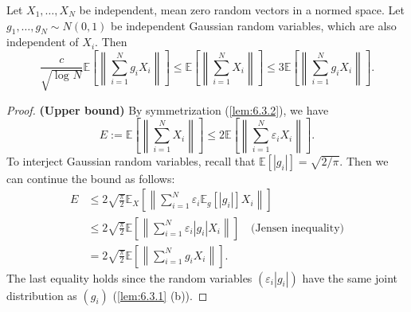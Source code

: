 \begin{lemma}
\label{lem:6.6.2}
Let $X_1, \dots, X_N$ be independent, mean zero random vectors in a normed space. Let $g_1, \dots, g_N 
\sim N(0, 1)$ be independent Gaussian random variables, which are also independent of $X_i$. Then 
\[ \frac{c}{\sqrt{\log_{}{N}}} \mathbb{E}\left[ \left\lVert \sum_{i = 1}^{N} g_iX_i \right\rVert \right] 
\leq \mathbb{E}\left[ \left\lVert \sum_{i = 1}^{N} X_i \right\rVert \right] 
\leq 3 \mathbb{E}\left[ \left\lVert \sum_{i = 1}^{N} g_i X_i \right\rVert \right]. \]
\end{lemma}

\begin{proof}
\textbf{(Upper bound)} By symmetrization (\cref{lem:6.3.2}), we have 
\[ E := \mathbb{E}\left[ \left\lVert \sum_{i = 1}^{N} X_i \right\rVert \right] 
\leq 2 \mathbb{E}\left[ \left\lVert \sum_{i = 1}^{N} \varepsilon_i X_i \right\rVert \right]. \]
To interject Gaussian random variables, recall that $\mathbb{E}\left[ |g_i| \right] = \sqrt{2 / \pi}$. Then 
we can continue the bound as follows: 
\begin{align*}
	E 
	&\leq 2 \sqrt{\frac{\pi}{2}} \mathbb{E}_X\left[ \left\lVert \sum_{i = 1}^{N} \varepsilon_i 
	\mathbb{E}_g\left[ |g_i| \right] X_i \right\rVert \right] \\
	&\leq 2 \sqrt{\frac{\pi}{2}} \mathbb{E}\left[ \left\lVert \sum_{i = 1}^{N} 
	\varepsilon_i |g_i| X_i \right\rVert \right] \quad \text{(Jensen inequality)} \\
	&= 2 \sqrt{\frac{\pi}{2}} \mathbb{E}\left[ \left\lVert \sum_{i = 1}^{N} 
	g_i X_i \right\rVert \right]. 
\end{align*}
The last equality holds since the random variables $(\varepsilon_i |g_i|)$ have the same joint distribution as 
$(g_i)$ (\cref{lem:6.3.1} (b)).


\end{proof}
